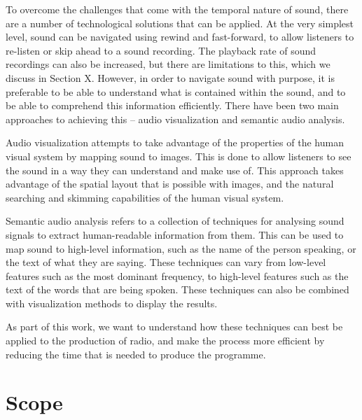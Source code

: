 To overcome the challenges that come with the temporal nature of sound, there are a number of technological solutions
that can be applied. At the very simplest level, sound can be navigated using rewind and fast-forward, to allow
listeners to re-listen or skip ahead to a sound recording. The playback rate of sound recordings can also be increased,
but there are limitations to this, which we discuss in Section X. However, in order to navigate sound with purpose, it
is preferable to be able to understand what is contained within the sound, and to be able to comprehend this
information efficiently. There have been two main approaches to achieving this -- audio visualization and semantic
audio analysis.


Audio visualization attempts to take advantage of the properties of the human visual system by mapping sound to images.
This is done to allow listeners to see the sound in a way they can understand and make use of. This approach takes
advantage of the spatial layout that is possible with images, and the natural searching and skimming capabilities of
the human visual system.

Semantic audio analysis refers to a collection of techniques for analysing sound signals to extract human-readable
information from them. This can be used to map sound to high-level information, such as the name of the person
speaking, or the text of what they are saying. These techniques can vary from low-level features such as the most
dominant frequency, to high-level features such as the text of the words that are being spoken. These techniques can
also be combined with visualization methods to display the results.

As part of this work, we want
to understand how these techniques can best be applied to the production of radio, and make the process more efficient
by reducing the time that is needed to produce the programme. 

\section{Scope}

